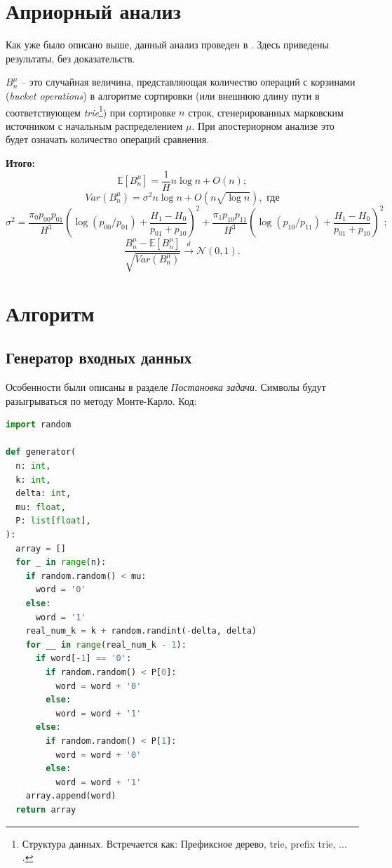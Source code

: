 \documentclass[a4paper, 12pt]{article}
\begin{document}
\newpage
\section{Априорный анализ}
Как уже было описано выше, данный анализ проведен в \cite{limitth}. Здесь приведены результаты, без доказательств.

$B_n^\mu$ -- это случайная величина, представляющая количество операций с корзинами (\textit{bucket operations}) в алгоритме сортировки (или внешнюю длину пути в соответствующем \textit{trie}\footnote{Структура данных. Встречается как: Префиксное дерево, trie, prefix trie, ... \cite{trie}.}) при сортировке $n$ строк, сгенерированных марковским источником с начальным распределением $\mu$. При апостериорном анализе это будет означать количество операций сравнения.

\textbf{Итого:}
\begin{equation}
	\mathbb{E}[B_n^\mu] = \dfrac{1}{H}n\log n+O(n); \label{eq:E}
\end{equation}
\begin{equation}
	Var(B_n^\mu) = \sigma^2n\log n+O(n\sqrt{\log n}), \text{ где} \label{eq:Var}
\end{equation}
\begin{equation}
	\sigma^2 = \dfrac{\pi_0p_{00}p_{01}}{H^3}\left(\log(p_{00}/p_{01})+\dfrac{H_1-H_0}{p_{01}+p_{10}}\right)^2 + \dfrac{\pi_1p_{10}p_{11}}{H^3}\left(\log(p_{10}/p_{11})+\dfrac{H_1-H_0}{p_{01}+p_{10}}\right)^2;
\end{equation}
\begin{equation}
	\dfrac{B_n^\mu-\mathbb{E}[B_n^\mu]}{\sqrt{Var(B_n^\mu)}}  \stackrel{d}{\longrightarrow} \mathcal{N}(0,1) \label{eq:distribution}.
\end{equation}

\newpage
\section{Алгоритм}
\subsection{Генератор входных данных}
Особенности были описаны в разделе \textit{Постановка задачи}. Символы будут разыгрываться по методу Монте-Карло. Код:
\begin{lstlisting}[language=Python]
import random

def generator(
  n: int,
  k: int,
  delta: int,
  mu: float,
  P: list[float],
):
  array = []
  for _ in range(n):
    if random.random() < mu:
      word = '0'
    else:
      word = '1'
    real_num_k = k + random.randint(-delta, delta)
    for __ in range(real_num_k - 1):
      if word[-1] == '0':
        if random.random() < P[0]:
          word = word + '0'
        else:
          word = word + '1'
      else:
        if random.random() < P[1]:
          word = word + '0'
        else:
          word = word + '1'
    array.append(word)
  return array
\end{lstlisting}
\end{document}
